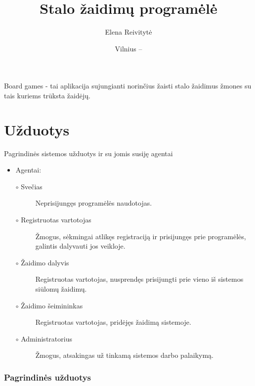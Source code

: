\documentclass{VUMIFPSkursinis}
\title{Stalo žaidimų programėlė}
\author{Elena Reivitytė}
\date{Vilnius – \the\year}
\begin{document}
\maketitle

\tableofcontents

Board games - tai aplikacija sujungianti norinčius žaisti stalo žaidimus žmones
su tais kuriems trūksta žaidėjų.

\section{Užduotys}
Pagrindinės sistemos užduotys ir su jomis susiję agentai

	\renewcommand{\labelitemi}{$\bullet$}
	\renewcommand{\labelitemii}{$\circ$}
	\begin{itemize}
		\item Agentai:
			\begin{description}
				\item [$\circ$ Svečias] Neprisijungęs programėlės naudotojas.
				\item [$\circ$ Registruotas vartotojas] Žmogus, sėkmingai atlikęs registraciją ir prisijungęs prie programėlės, galintis dalyvauti jos veikloje.
				\item [$\circ$ Žaidimo dalyvis] Registruotas vartotojas, nusprendęs prisijungti prie vieno iš sistemos siūlomų žaidimų.
				\item [$\circ$ Žaidimo šeimininkas] Registruotas vartotojas, pridėjęs žaidimą sistemoje.
				\item [$\circ$ Administratorius] Žmogus, atsakingas už tinkamą sistemos darbo palaikymą.
			\end{description}
	\end{itemize}
		
	\subsubsection*{Pagrindinės užduotys}
	
\end{document}
